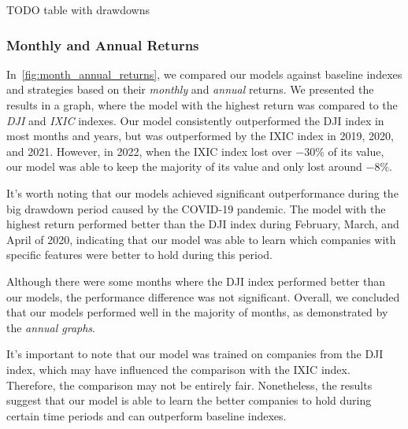 \documentclass[../xlapes02]{subfiles}
\begin{document}
    TODO table with drawdowns

    \subsubsection{Monthly and Annual Returns}
    In~\cref{fig:month_annual_returns}, we compared our models against baseline indexes and strategies based on their \emph{monthly} and \emph{annual} returns. We presented the results in a graph, where the model with the highest return was compared to the \emph{DJI} and \emph{IXIC} indexes. Our model consistently outperformed the DJI index in most months and years, but was outperformed by the IXIC index in 2019, 2020, and 2021. However, in 2022, when the IXIC index lost over $-30\%$ of its value, our model was able to keep the majority of its value and only lost around $-8\%$.

    It's worth noting that our models achieved significant outperformance during the big drawdown period caused by the COVID-19 pandemic. The model with the highest return performed better than the DJI index during February, March, and April of 2020, indicating that our model was able to learn which companies with specific features were better to hold during this period.

    Although there were some months where the DJI index performed better than our models, the performance difference was not significant. Overall, we concluded that our models performed well in the majority of months, as demonstrated by the \emph{annual graphs}.

    It's important to note that our model was trained on companies from the DJI index, which may have influenced the comparison with the IXIC index. Therefore, the comparison may not be entirely fair. Nonetheless, the results suggest that our model is able to learn the better companies to hold during certain time periods and can outperform baseline indexes.
\end{document}
